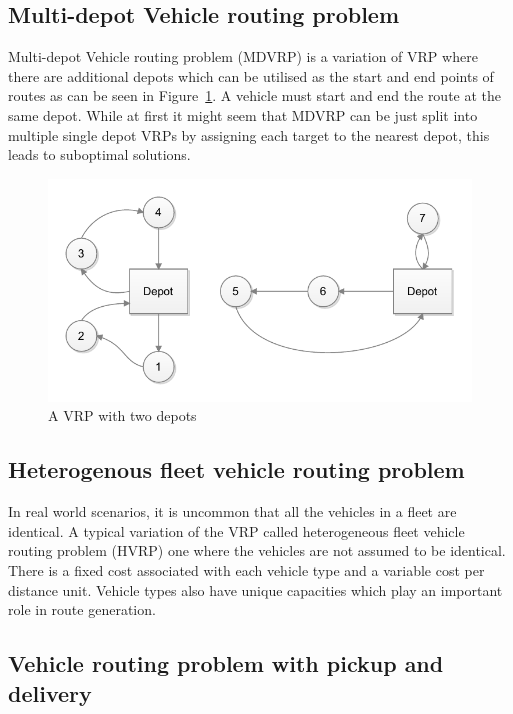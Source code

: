 \subsection{Multi-depot Vehicle routing problem}

Multi-depot Vehicle routing problem (MDVRP) is a variation of VRP where there are additional depots which can be utilised as the start and end points of routes as can be seen in Figure~\ref{fig:multidepot}. A vehicle must start and end the route at the same depot. While at first it might seem that MDVRP can be just split into multiple single depot VRPs by assigning each target to the nearest depot, this leads to suboptimal solutions. \cite{salhi2014multi}


\begin{figure}[H]
  \begin{center}
    \includegraphics{images/multidepot.pdf}
    \caption{A VRP with two depots}
    \label{fig:multidepot}
  \end{center}
\end{figure}

\subsection{Heterogenous fleet vehicle routing problem}

In real world scenarios, it is uncommon that all the vehicles in a fleet are identical. A typical variation of the VRP called heterogeneous fleet vehicle routing problem (HVRP) one where the vehicles are not assumed to be identical. There is a fixed cost associated with each vehicle type and a variable cost per distance unit. Vehicle types also have unique capacities which play an important role in route generation. \cite{gendreau1999tabu}


\subsection{Vehicle routing problem with pickup and delivery}

